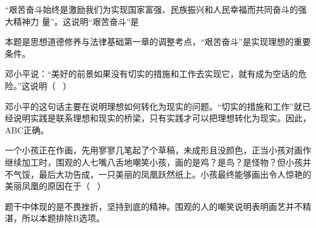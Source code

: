 \question ``艰苦奋斗始终是激励我们为实现国家富强、民族振兴和人民幸福而共同奋斗的强大精神力
量''。这说明``艰苦奋斗''是
\par{}
\begin{solution}本题是思想道德修养与法律基础第一章的调整考点，``艰苦奋斗''是实现理想的重要条件。
\end{solution}
\question 邓小平说：``美好的前景如果没有切实的措施和工作去实现它，就有成为空话的危险。''这说明（
~）
\par{}
\begin{solution}邓小平的这句话主要在说明理想如何转化为现实的问题。``切实的措施和工作''就已经说明实践是联系理想和现实的桥梁，只有实践才可以把理想转化为现实。因此，ABC正确。
\end{solution}
\question 一个小孩正在作画，先用寥寥几笔起了个草稿，未成形且没颜色，正当小孩对画作继续加工时，围观的人七嘴八舌地嘲笑小孩，画的是鸡？是鸟？是怪物？但小孩并不气馁，最后大功告成，一只美丽的凤凰跃然纸上。小孩最终能够画出令人惊艳的美丽凤凰的原因在于（
~）
\par{}
\begin{solution}题干中体现的是不畏挫折，坚持到底的精神。围观的人的嘲笑说明表明画艺并不精湛，所以本题排除B选项。
\end{solution}
